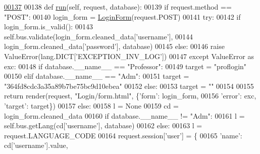 \begin{DoxyCode}
\hypertarget{classLogin_1_1LoginUnit_1_1UiLogin_l00137}{}\hyperlink{classLogin_1_1LoginUnit_1_1UiLogin_a9cd61a78d5ab0d201051ccf5898f86bc}{00137} 
00138     \textcolor{keyword}{def }\hyperlink{classLogin_1_1LoginUnit_1_1UiLogin_a9cd61a78d5ab0d201051ccf5898f86bc}{run}(self, request, database):
00139         \textcolor{keywordflow}{if} request.method == \textcolor{stringliteral}{"POST"}:
00140             login\_form = \hyperlink{classLogin_1_1forms_1_1LoginForm}{LoginForm}(request.POST)
00141             \textcolor{keywordflow}{try}: 
00142                 \textcolor{keywordflow}{if} login\_form.is\_valid():
00143                     self.bus.validate(login\_form.cleaned\_data[\textcolor{stringliteral}{'username'}],
00144                         login\_form.cleaned\_data[\textcolor{stringliteral}{'password'}], database)
00145                 \textcolor{keywordflow}{else}:
00146                     \textcolor{keywordflow}{raise} ValueError(lang.DICT[\textcolor{stringliteral}{'EXCEPTION\_INV\_LOG'}])
00147             \textcolor{keywordflow}{except} ValueError \textcolor{keyword}{as} exc:
00148                 \textcolor{keywordflow}{if} database.\_\_name\_\_ == \textcolor{stringliteral}{"Professor"}:
00149                     target = \textcolor{stringliteral}{"proflogin"}
00150                 \textcolor{keywordflow}{elif} database.\_\_name\_\_ == \textcolor{stringliteral}{"Adm"}:
00151                     target = \textcolor{stringliteral}{"364fd8cdc3a35a89b7be75bc9d10ebea"}
00152                 \textcolor{keywordflow}{else}:
00153                     target = \textcolor{stringliteral}{""}
00154 
00155                 \textcolor{keywordflow}{return} render(request, \textcolor{stringliteral}{"Login/form.html"}, \{\textcolor{stringliteral}{'form'}: login\_form, 
00156                     \textcolor{stringliteral}{'error'}: exc, \textcolor{stringliteral}{'target'}: target\})
00157             \textcolor{keywordflow}{else}:
00158                 l = \textcolor{keywordtype}{None}
00159                 cd = login\_form.cleaned\_data
00160                 \textcolor{keywordflow}{if} database.\_\_name\_\_ != \textcolor{stringliteral}{"Adm"}:
00161                     l = self.bus.getLang(cd[\textcolor{stringliteral}{'username'}], database)
00162                 \textcolor{keywordflow}{else}:
00163                     l = request.LANGUAGE\_CODE
00164                 request.session[\textcolor{stringliteral}{'user'}] = \{
00165                                 \textcolor{stringliteral}{'name'}: cd[\textcolor{stringliteral}{'username'}].value,

\end{DoxyCode}
